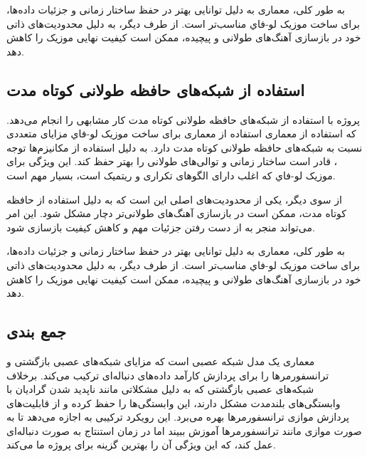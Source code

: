 به طور کلی، معماری  به دلیل توانایی بهتر در حفظ ساختار زمانی و جزئیات داده‌ها، برای ساخت موزیک ﻟﻮ-ﻓﺎﻱ مناسب‌تر است. از طرف دیگر،  به دلیل محدودیت‌های ذاتی خود در بازسازی آهنگ‌های طولانی و پیچیده، ممکن است کیفیت نهایی موزیک را کاهش دهد.

\subsection{استفاده از شبکه‌های حافظه طولانی کوتاه مدت}
پروژه  \cite{mrkarpin_2023_github} با استفاده از شبکه‌های حافظه طولانی کوتاه مدت  کار مشابهی را انجام می‌دهد. که استفاده از معماری
استفاده از معماری  برای ساخت موزیک ﻟﻮ-ﻓﺎﻱ مزایای متعددی نسبت به شبکه‌های حافظه طولانی کوتاه مدت
دارد.  به دلیل استفاده از مکانیزم‌ها توجه ، قادر است ساختار زمانی و توالی‌های طولانی را بهتر حفظ کند. این ویژگی برای موزیک ﻟﻮ-ﻓﺎﻱ که اغلب دارای الگوهای تکراری و ریتمیک است، بسیار مهم است.

از سوی دیگر، یکی از محدودیت‌های اصلی  این است که به دلیل استفاده از حافظه کوتاه مدت، ممکن است در بازسازی آهنگ‌های طولانی‌تر دچار مشکل شود. این امر می‌تواند منجر به از دست رفتن جزئیات مهم و کاهش کیفیت بازسازی شود.

به طور کلی، معماری  به دلیل توانایی بهتر در حفظ ساختار زمانی و جزئیات داده‌ها، برای ساخت موزیک ﻟﻮ-ﻓﺎﻱ مناسب‌تر است. از طرف دیگر،  به دلیل محدودیت‌های ذاتی خود در بازسازی آهنگ‌های طولانی و پیچیده، ممکن است کیفیت نهایی موزیک را کاهش دهد.

\subsection{جمع بندی}
معماری  یک مدل شبکه عصبی است که مزایای شبکه‌های عصبی بازگشتی و ترانسفورمرها را برای پردازش کارآمد داده‌های دنباله‌ای ترکیب می‌کند. برخلاف شبکه‌های عصبی بازگشتی که به دلیل مشکلاتی مانند ناپدید شدن گرادیان با وابستگی‌های بلندمدت مشکل دارند،  این وابستگی‌ها را حفظ کرده و از قابلیت‌های پردازش موازی ترانسفورمرها بهره می‌برد. این رویکرد ترکیبی به  اجازه می‌دهد تا به صورت موازی مانند ترانسفورمرها آموزش ببیند اما در زمان استنتاج به صورت دنباله‌ای عمل کند، که این ویژگی آن را بهترین گزینه برای پروژه ما می‌کند.